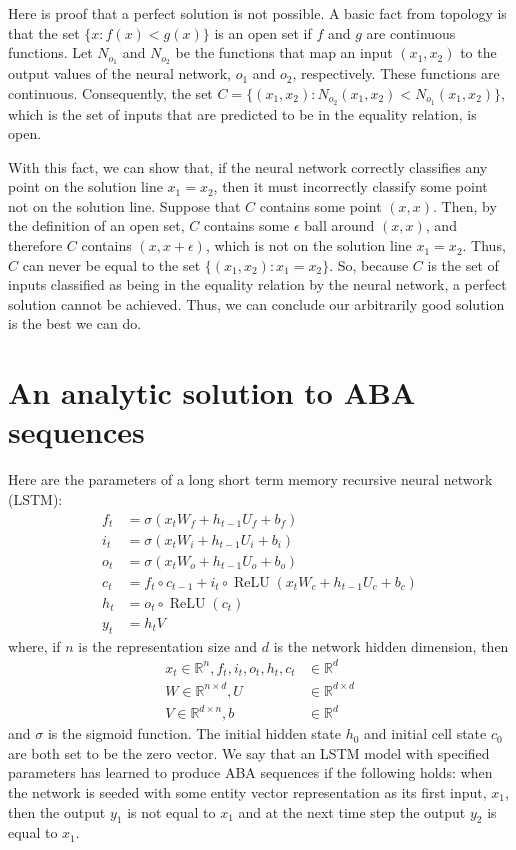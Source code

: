 \documentclass{article}
\DeclareMathOperator{\ReLU}{ReLU}
\begin{document}
Here is proof that a perfect solution is not possible. A basic fact from topology is that the set $\{x: f(x) < g(x)\}$ is an open set if $f$ and $g$ are continuous functions. Let $N_{o_1}$ and $N_{o_2}$ be the functions that map an input $(x_1,x_2)$ to the output values of the neural network, $o_1$ and $o_2$, respectively. These functions are continuous. Consequently, the set $C = \{(x_1,x_2): N_{o_2}(x_1,x_2) < N_{o_1}(x_1,x_2)\}$, which is the set of inputs that are predicted to be in the equality relation, is open.

With this fact, we can show that, if the neural network correctly classifies any point on the solution line $x_1 = x_2$, then it must incorrectly classify some point not on the solution line. Suppose that $C$ contains some point $(x,x)$. Then, by the definition of an open set, $C$ contains some $\epsilon$ ball around $(x,x)$, and therefore $C$ contains $(x,x+\epsilon)$, which is not on the solution line $x_1=x_2$. Thus, $C$ can never be equal to the set $\{(x_1,x_2):x_1=x_2\}$. So, because $C$ is the set of inputs classified as being in the equality relation by the neural network, a perfect solution cannot be achieved. Thus, we can conclude our arbitrarily good solution is the best we can do.


\section{An analytic solution to ABA sequences}\label{sec:analyticlm}


Here are the parameters of a long short term memory recursive neural network (LSTM):
%
\begin{align*}
  f_t &= \sigma(x_t W_f  + h_{t-1} U_f  + b_f) \\
  i_t &= \sigma(x_t W_i  + h_{t-1} U_i + b_i) \\
  o_t &= \sigma(x_t W_o +  h_{t-1} U_o + b_o)\\
  c_t &= f_t \circ c_{t-1} + i_t \circ \ReLU(x_tW_c + h_{t-1}U_c + b_c) \\
  h_t &= o_t \circ \ReLU(c_t) \\
  y_t &= h_tV
\end{align*}
%
where, if $n$ is the representation size and $d$ is the network hidden dimension, then
%
\begin{align*}
  x_t \in \mathbb{R}^n, f_t, i_t, o_t,  h_t, c_t &\in \mathbb{R}^d\\
  W \in \mathbb{R}^{n \times d}, U &\in \mathbb{R}^{d \times d}\\
  V \in \mathbb{R}^{d \times n}, b &\in \mathbb{R}^d
\end{align*}
%
and $\sigma$ is the sigmoid function. The initial hidden state $h_0$ and initial cell state $c_0$ are both set to be the zero vector. We say that an LSTM model with specified parameters has learned to produce ABA sequences if the following holds: when the network is seeded with some entity vector representation as its first input, $x_1$, then the output $y_1$ is not equal to $x_1$ and at the next time step the output $y_2$ is equal to $x_1$.
\end{document}
